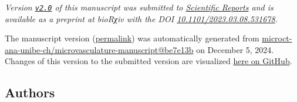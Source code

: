 \emph{Version \href{https://github.com/microct-ana-unibe-ch/microvasculature-manuscript/releases/tag/v1.0}{\texttt{v2.0}} of this manuscript was submitted to \href{https://www.nature.com/srep/}{Scientific Reports} and is available as a preprint at bioRχiv with the DOI \href{https://doi.org/10.1101/2023.03.08.531678}{10.1101/2023.03.08.531678}.}

The manuscript version
(\href{https://microct-ana-unibe-ch.github.io/microvasculature-manuscript/v/be7e13bbfb2a06c641670ebe5de5c4c746deea63/}{permalink})
was automatically generated
from \href{https://github.com/microct-ana-unibe-ch/microvasculature-manuscript/tree/be7e13bbfb2a06c641670ebe5de5c4c746deea63}{microct-ana-unibe-ch/microvasculature-manuscript@be7e13b}
on December 5, 2024.
Changes of this version to the submitted version are visualized \href{https://github.com/microct-ana-unibe-ch/microvasculature-manuscript/compare/v2.0.1...be7e13bbfb2a06c641670ebe5de5c4c746deea63\#files_bucket}{here on GitHub}.

\hypertarget{authors}{%
\subsection{Authors}\label{authors}}


